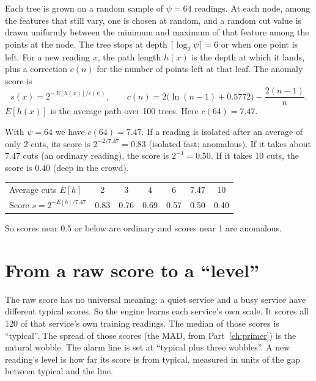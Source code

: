\begin{techbox}
Each tree is grown on a random sample of $\psi=64$ readings. At each node, among the features that still vary, one is chosen at random, and a random cut value is drawn uniformly between the minimum and maximum of that feature among the points at the node. The tree stops at depth $\lceil\log_2\psi\rceil=6$ or when one point is left. For a new reading $x$, the path length $h(x)$ is the depth at which it lands, plus a correction $c(n)$ for the number of points left at that leaf. The anomaly score is
\[
s(x)=2^{-\,E[h(x)]/c(\psi)},\qquad c(n)=2\bigl(\ln(n-1)+0.5772\bigr)-\frac{2(n-1)}{n}.
\]
$E[h(x)]$ is the average path over 100 trees. Here $c(64)=7.47$.
\end{techbox}

\begin{examplebox}
With $\psi=64$ we have $c(64)=7.47$. If a reading is isolated after an average of only 2 cuts, its score is $2^{-2/7.47}=0.83$ (isolated fast: anomalous). If it takes about 7.47 cuts (an ordinary reading), the score is $2^{-1}=0.50$. If it takes 10 cuts, the score is $0.40$ (deep in the crowd).

\begin{center}
\small
\begin{tabular}{lcccccc}
\toprule
Average cuts $E[h]$ & 2 & 3 & 4 & 6 & 7.47 & 10\\
Score $s=2^{-E[h]/7.47}$ & 0.83 & 0.76 & 0.69 & 0.57 & 0.50 & 0.40\\
\bottomrule
\end{tabular}
\end{center}
So scores near 0.5 or below are ordinary and scores near 1 are anomalous.
\end{examplebox}

\section{From a raw score to a ``level''}
\begin{simplebox}
The raw score has no universal meaning: a quiet service and a busy service have different typical scores. So the engine learns each service's own scale. It scores all 120 of that service's own training readings. The median of those scores is ``typical''. The spread of those scores (the MAD, from Part~\ref{ch:primer}) is the natural wobble. The alarm line is set at ``typical plus three wobbles''. A new reading's level is how far its score is from typical, measured in units of the gap between typical and the line.
\end{simplebox}


